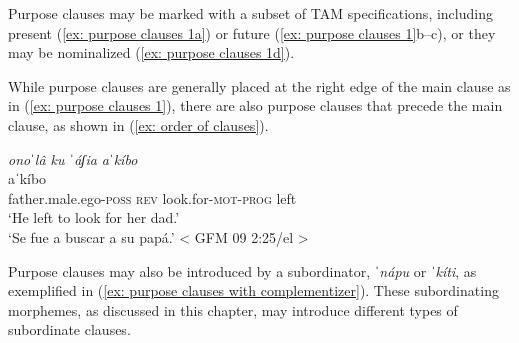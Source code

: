 Purpose clauses may be marked with a subset of TAM specifications, including present (\ref{ex: purpose clauses 1a}) or future (\ref{ex: purpose clauses 1}b--c), or they may be nominalized (\ref{ex: purpose clauses 1d}).

While purpose clauses are generally placed at the right edge of the main clause as in (\ref{ex: purpose clauses 1}), there are also purpose clauses that precede the main clause, as shown in (\ref{ex: order of clauses}).

\ea\label{ex: order of clauses}

    \textit{onoˈlâ ku ˈáʃia aˈkíbo}\\
     aˈkíbo\\
            father.male.ego\textsc{-poss} \textsc{rev} look.for-\textsc{mot-prog} left\\
    \glt    `He left to look for her dad.’\\
    \glt    `Se fue a buscar a su papá.’ < GFM 09 2:25/el >\\

\z

Purpose clauses may also be introduced by a subordinator, \textit{ˈnápu} or \textit{ˈkíti}, as exemplified in (\ref{ex: purpose clauses with complementizer}). These subordinating morphemes, as discussed in this chapter, may introduce different types of subordinate clauses.


\ea\label{ex: purpose clauses with complementizer}

